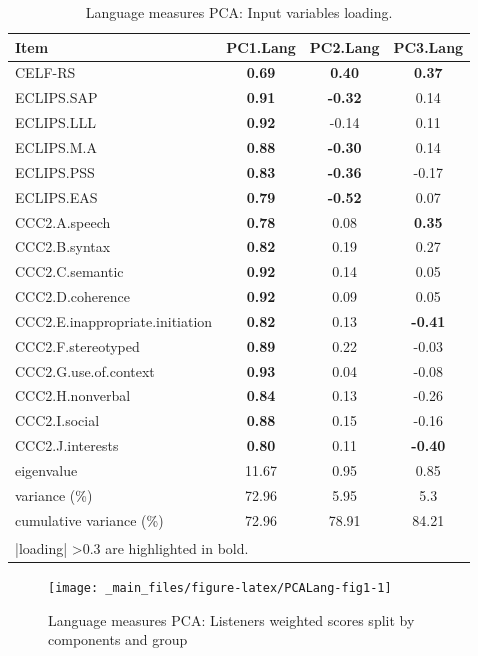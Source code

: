 \documentclass[a4paper, twoside]{templates/ociamthesis}
\begin{document}
\begin{table}

\caption{\label{tab:PCALang-Tab}Language measures PCA: Input variables loading.}
\centering
\begin{tabular}[t]{lccc}
\toprule
Item & PC1.Lang & PC2.Lang & PC3.Lang\\
\midrule
CELF-RS & \textbf{0.69} & \textbf{0.40} & \textbf{0.37}\\
ECLIPS.SAP & \textbf{0.91} & \textbf{-0.32} & 0.14\\
ECLIPS.LLL & \textbf{0.92} & -0.14 & 0.11\\
ECLIPS.M.A & \textbf{0.88} & \textbf{-0.30} & 0.14\\
ECLIPS.PSS & \textbf{0.83} & \textbf{-0.36} & -0.17\\
ECLIPS.EAS & \textbf{0.79} & \textbf{-0.52} & 0.07\\
CCC2.A.speech & \textbf{0.78} & 0.08 & \textbf{0.35}\\
CCC2.B.syntax & \textbf{0.82} & 0.19 & 0.27\\
CCC2.C.semantic & \textbf{0.92} & 0.14 & 0.05\\
CCC2.D.coherence & \textbf{0.92} & 0.09 & 0.05\\
CCC2.E.inappropriate.initiation & \textbf{0.82} & 0.13 & \textbf{-0.41}\\
CCC2.F.stereotyped & \textbf{0.89} & 0.22 & -0.03\\
CCC2.G.use.of.context & \textbf{0.93} & 0.04 & -0.08\\
CCC2.H.nonverbal & \textbf{0.84} & 0.13 & -0.26\\
CCC2.I.social & \textbf{0.88} & 0.15 & -0.16\\
CCC2.J.interests & \textbf{0.80} & 0.11 & \textbf{-0.40}\\
\midrule
eigenvalue & 11.67 & 0.95 & 0.85\\
variance (\%) & 72.96 & 5.95 & 5.3\\
cumulative variance (\%) & 72.96 & 78.91 & 84.21\\
\bottomrule
\multicolumn{4}{l}{\textsuperscript{} |loading| >0.3 are highlighted in bold.}\\
\end{tabular}
\end{table}

\begin{figure}

{\centering \texttt{[image: \_main\_files/figure-latex/PCALang-fig1-1]} 

}

\caption{Language measures PCA: Listeners weighted scores split by components and group}\label{fig:PCALang-fig1}
\end{figure}
\end{document}
